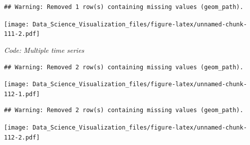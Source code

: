 \documentclass[
]{article}
\newenvironment{Shaded}{\begin{snugshade}}{\end{snugshade}}
\newcommand{\CommentTok}[1]{\textcolor[rgb]{0.56,0.35,0.01}{\textit{#1}}}
\newcommand{\DataTypeTok}[1]{\textcolor[rgb]{0.13,0.29,0.53}{#1}}
\newcommand{\KeywordTok}[1]{\textcolor[rgb]{0.13,0.29,0.53}{\textbf{#1}}}
\newcommand{\NormalTok}[1]{#1}
\newcommand{\OperatorTok}[1]{\textcolor[rgb]{0.81,0.36,0.00}{\textbf{#1}}}
\newcommand{\StringTok}[1]{\textcolor[rgb]{0.31,0.60,0.02}{#1}}
\begin{document}
\begin{verbatim}
## Warning: Removed 1 row(s) containing missing values (geom_path).
\end{verbatim}

\texttt{[image: Data\_Science\_Visualization\_files/figure-latex/unnamed-chunk-111-2.pdf]}

\emph{Code: Multiple time series}

\begin{Shaded}
\end{Shaded}

\begin{verbatim}
## Warning: Removed 2 row(s) containing missing values (geom_path).
\end{verbatim}

\texttt{[image: Data\_Science\_Visualization\_files/figure-latex/unnamed-chunk-112-1.pdf]}

\begin{Shaded}
\end{Shaded}

\begin{verbatim}
## Warning: Removed 2 row(s) containing missing values (geom_path).
\end{verbatim}

\texttt{[image: Data\_Science\_Visualization\_files/figure-latex/unnamed-chunk-112-2.pdf]}
\end{document}
